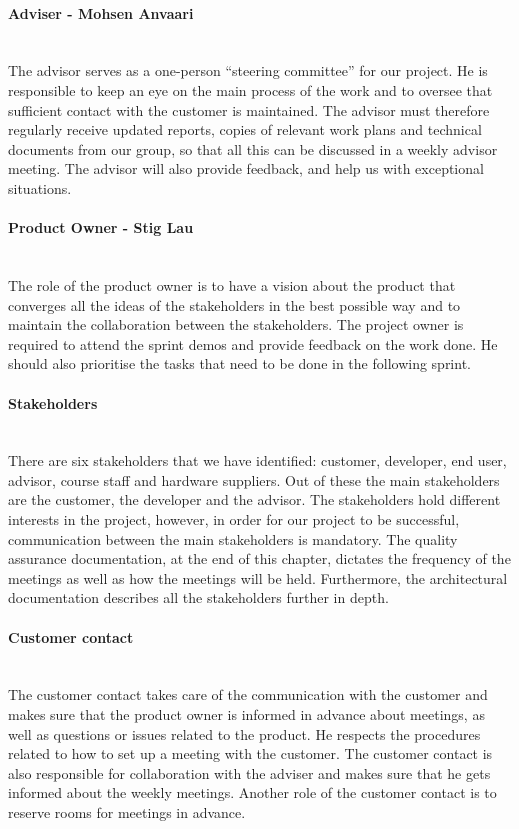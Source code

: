 \documentclass[../document.tex]{subfiles}
\begin{document}
\paragraph{Adviser - Mohsen Anvaari} \ \\
The advisor serves as a one-person “steering committee” for our project. He is responsible to keep an eye on the main process of the work and to oversee that sufficient contact with the customer is maintained. The advisor must therefore regularly receive updated reports, copies of relevant work plans and technical documents from our group, so that all this can be discussed in a weekly advisor meeting. The advisor will also provide feedback, and help us with exceptional situations.


\paragraph{Product Owner - Stig Lau} \ \\
The role of the product owner is to have a vision about the product that converges all the ideas of the stakeholders in the best possible way and to maintain the collaboration between the stakeholders. The project owner is required to attend the sprint demos and provide feedback on the work done. He should also prioritise the tasks that need to be done in the following sprint. 

\paragraph{Stakeholders} \ \\
There are six stakeholders that we have identified: customer, developer, end user, advisor, course staff and hardware suppliers. Out of these the main stakeholders are the customer, the developer and the advisor. The stakeholders hold different interests in the project, however, in order for our project to be successful, communication between the main stakeholders is mandatory. The quality assurance documentation, at the end of this chapter, dictates the frequency of the meetings as well as how the meetings will be held. Furthermore, the architectural documentation describes all the stakeholders further in depth.

\paragraph{Customer contact} \ \\
The customer contact takes care of the communication with the customer and makes sure that the product owner is informed in advance about meetings, as well as questions or issues related to the product. He respects the procedures related to how to set up a meeting with the customer. The customer contact is also responsible for collaboration with the adviser and makes sure that he gets informed about the weekly meetings. Another role of the customer contact is to reserve rooms for meetings in advance.
\end{document}
